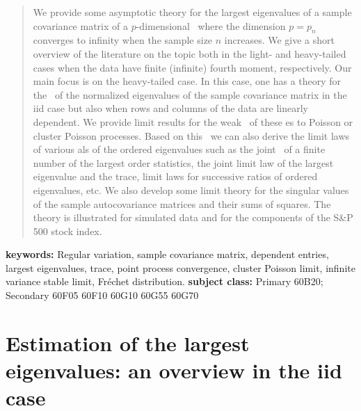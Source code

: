 \begin{abstract}
We  provide some  asymptotic theory for the largest eigenvalues of a sample covariance matrix
of a $p$-dimensional \ts\ where the dimension $p=p_n$ converges to infinity when the sample size $n$ increases.
We give a short overview of the literature on the topic both in the light- and heavy-tailed cases when the data have
finite (infinite) fourth moment, respectively.
Our main focus is on the heavy-tailed case. In this case, one has a theory for the \pp\ of the normalized eigenvalues
of the sample covariance matrix in the iid case but also when rows and columns of the data are linearly dependent.
We provide limit results for the weak \con\ of these \pp es to Poisson or cluster Poisson processes. Based on
this \con\ we can also derive the limit laws of various \fct als of the ordered eigenvalues such as the
joint \con\ of a finite number of the largest order statistics, the joint limit law of the largest eigenvalue and the trace,
limit laws for successive ratios of ordered eigenvalues,
etc. We also develop some
limit theory for the singular values of the sample autocovariance matrices and their sums of squares. The theory is illustrated
for simulated data and for the components of the S\&P 500 stock index.
\end{abstract}
{\bf keywords: }{Regular variation, sample covariance matrix, dependent
  entries, largest  eigenvalues, trace, point process convergence,
  cluster Poisson limit, infinite variance stable limit, Fr\'echet
  distribution.}
{\bf subject class: }{Primary 60B20; Secondary 60F05 60F10 60G10 60G55 60G70}



\section{Estimation of the largest eigenvalues: an overview in the iid case}\label{sec:motivation}\setcounter{equation}{0}
